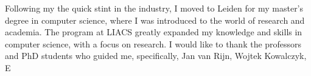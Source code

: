 Following my the quick stint in the industry, I moved to Leiden for my master's degree in computer science, where I was introduced to the world of research and academia. The program at LIACS greatly expanded my knowledge and skills in computer science, with a focus on research. I would like to thank the professors and PhD students who guided me, specifically, Jan van Rijn, Wojtek Kowalczyk, E
\endgroup



